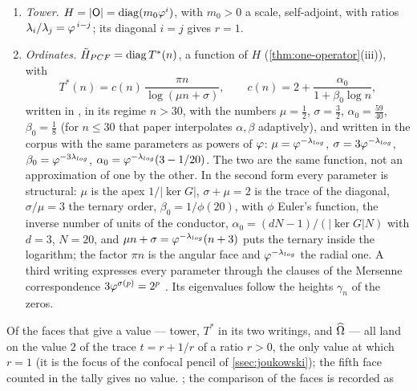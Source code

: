 \begin{theorem}
\begin{enumerate}[label=\textup{(\roman*)}]
    size.
  \item \emph{Tower.}  $H=|\mathsf{O}|=\operatorname{diag}(m_0\varphi^i)$, with $m_0>0$ a scale, self-adjoint, with ratios
    $\lambda_i/\lambda_j=\varphi^{\,i-j}$; its diagonal $i=j$ gives $r=1$.
  \item \emph{Ordinates.}  $\tilde H_{PCF}=\operatorname{diag}T^*(n)$, a function of $H$ (\cref{thm:one-operator}\textup{(iii)}), with
    \[
      T^*(n)=c(n)\,\frac{\pi n}{\log(\mu n+\sigma)},\qquad
      c(n)=2+\frac{\alpha_0}{1+\beta_0\log n},
    \]
    written in \cite{gonzalez25hp}, in its regime $n>30$, with the numbers
    $\mu=\tfrac12$, $\sigma=\tfrac32$, $\alpha_0=\tfrac{59}{40}$, $\beta_0=\tfrac18$ (for
    $n\le30$ that paper interpolates $\alpha,\beta$ adaptively), and written in the corpus with the same
    parameters as powers of $\varphi$: $\mu=\varphi^{-\lambda_{log}}$, $\sigma=3\varphi^{-\lambda_{log}}$,
    $\beta_0=\varphi^{-3\lambda_{log}}$, $\alpha_0=\varphi^{-\lambda_{log}}(3-1/20)$.  The two are the
    same function, not an approximation of one by the other.  In the second form every
    parameter is structural: $\mu$ is the apex $1/|\ker G|$, $\sigma+\mu=2$ is the trace of
    the diagonal, $\sigma/\mu=3$ the ternary order, $\beta_0=1/\phi(20)$, with $\phi$ Euler's function, the inverse
    number of units of the conductor, $\alpha_0=(dN-1)/(|\ker G|N)$ with $d=3$, $N=20$,
    and $\mu n+\sigma=\varphi^{-\lambda_{log}}(n+3)$ puts the ternary inside the logarithm; the
    factor $\pi n$ is the angular face and $\varphi^{-\lambda_{log}}$ the radial one.  A third
    writing expresses every parameter through the clauses of the Mersenne
    correspondence $3\varphi^{\sigma(p)}=2^p$ \cite{gonzalez26mersenne}.  Its eigenvalues
    follow the heights $\gamma_n$ of the zeros.
\end{enumerate}
Of the faces that give a value --- tower, $T^*$ in its two writings, and $\widehat{\Omega}$ ---
all land on the value $2$ of the trace $t=r+1/r$ of a ratio $r>0$, the only value at which $r=1$ (it is the focus of the
confocal pencil of \cref{ssec:joukowski}); the fifth face counted in the tally  gives no value.
; the comparison of the faces is recorded as

\end{theorem}
